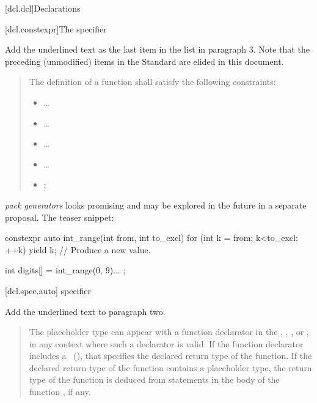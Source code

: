 
\setcounter{chapter}{6}
[dcl.dcl]{Declarations}

\setcounter{section}{1}
\setcounter{subsection}{4}
[dcl.constexpr]{The  specifier}%

Add the underlined text as the last item in the list in paragraph 3. Note that
the preceding (unmodified) items in the \Cpp Standard are elided in this
document.

\begin{quote}
  \setcounter{Paras}{2}
\pnum
{}
The definition of a  function shall satisfy the following
constraints:

\begin{itemize}
  \item \ldots
  \item \ldots
  \item \ldots
  \item \ldots
  \item {};
\end{itemize}
\end{quote}


\enterexample {} \textit{pack generators} looks promising and may be explored in the future in a separate proposal. The teaser snippet:
  
\begin{codeblock} 
  constexpr auto int_range(int from, int to_excl) {
    for (int k = from; k<to_excl; ++k) {
      yield k;  // Produce a new value.
    }
  }
      
  int digits[] = { int_range(0, 9)... };
\end{codeblock} 
\exitexample
\setcounter{section}{1}
\setcounter{subsection}{6}
\setcounter{subsubsection}{3}
[dcl.spec.auto]{ specifier}

Add the underlined text to paragraph two.

\begin{quote}
\setcounter{Paras}{1}
\pnum
The placeholder type can appear with a function declarator in the
, ,
, or ,
in any context where such a declarator is valid. If the function declarator
includes a ~(), that specifies
the declared return type of the function. If the declared return type of the
function contains a placeholder type, the return type of the function is
deduced from  statements in the body of the function , if any.
\end{quote}

